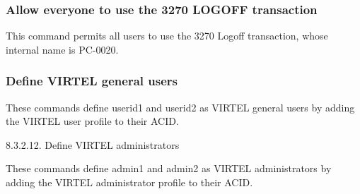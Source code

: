 \documentclass[letterpaper,10pt,english]{sphinxmanual}
\begin{document}
\subsubsection{Allow everyone to use the 3270 LOGOFF transaction}
\label{\detokenize{Installation_Guide:allow-everyone-to-use-the-3270-logoff-transaction}}
\begin{sphinxVerbatim}[commandchars=\\\{\}]
  
\end{sphinxVerbatim}


This command permits all users to use the 3270 Logoff transaction, whose internal name is PC-0020.


\subsubsection{Define VIRTEL general users}
\label{\detokenize{Installation_Guide:define-virtel-general-users}}
\begin{sphinxVerbatim}[commandchars=\\\{\}]
  
  
\end{sphinxVerbatim}


These commands define userid1 and userid2 as VIRTEL general users by adding the VIRTEL user profile to their ACID.

8.3.2.12. Define VIRTEL administrators

\begin{sphinxVerbatim}[commandchars=\\\{\}]
  
  
\end{sphinxVerbatim}


These commands define admin1 and admin2 as VIRTEL administrators by adding the VIRTEL administrator profile to their ACID.
\end{document}

